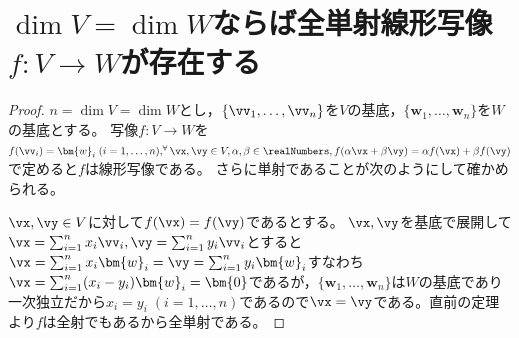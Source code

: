     \section{\texorpdfstring{$\dim{V}=\dim{W}$}{dim(V)=dim(W)}ならば全単射線形写像\texorpdfstring{$f:V\to W$}{f:V→W}が存在する}
        \begin{proof}
            $n=\dim{V}=\dim{W}$とし，$\{\vv_1,\dotsc,\vv_n\}$を$V$の基底，$\{\bm{w}_1,\dotsc,\bm{w}_n\}$を$W$の基底とする。
            写像$f:V\to W$を$f(\vv_i)=\bm{w}_i\;(i=1,\dotsc,n),^\forall\vx,\vy\in V,\alpha,\beta\in\realNumbers,f(\alpha\vx+\beta\vy)=\alpha f(\vx)+\beta f(\vy)$で定めると$f$は線形写像である。
            さらに単射であることが次のようにして確かめられる。
            \par
            $\vx,\vy\in V$に対して$f(\vx)=f(\vy)$であるとする。
            $\vx,\vy$を基底で展開して$\vx=\sum_{i=1}^n x_i\vv_i, \vy=\sum_{i=1}^n y_i\vv_i$とすると$\vx=\sum_{i=1}^n x_i\bm{w}_i = \vy=\sum_{i=1}^n y_i\bm{w}_i$すなわち$\vx=\sum_{i=1}^n (x_i-y_i)\bm{w}_i = \bm{0}$であるが，$\{\bm{w}_1,\dotsc,\bm{w}_n\}$は$W$の基底であり一次独立だから$x_i=y_i\;(i=1,\dotsc,n)$であるので$\vx=\vy$である。直前の定理より$f$は全射でもあるから全単射である。
        \end{proof}
